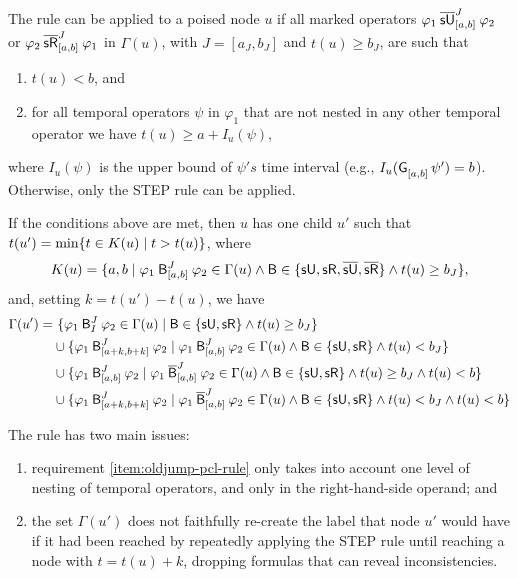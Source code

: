 \documentclass{easychair}
\begin{document}
The \oldjump{} rule can be applied to a poised node $u$ if 
all marked operators
$\msuntil[J]{[a,b]}{\varphi_1}{\varphi_2}$ or $\msrelease[J]{[a,b]}{\varphi_2}{\varphi_1}$ in $\Gamma(u)$,
with $J = [a_J, b_J]$ and $t(u) \geq b_J$, are such that
\begin{enumerate}[label=\roman*.]
\item $t(u) < b$, and
\item \label{item:oldjump-pcl-rule}
    for all temporal operators $\psi$ in $\varphi_1$ that are not nested in any other temporal operator we have $t(u) \geq a + I_u(\psi)$,
\end{enumerate}
where $I_u(\psi)$ is the upper bound of $\psi's$ time interval
(e.g., $I_u(\glob{[a,b]}\psi') = b$).
Otherwise, only the \textsf{STEP} rule can be applied.

If the conditions above are met, then $u$ has one child $u'$ such that $t(u') = \min \set{t \in K(u) \mid t > t(u)}$,
where
\[
K(u) = \set{a, b \mid \anybinop[J]{[a,b]}{\varphi_1}{\varphi_2} \in \Gamma(u) \land \mathsf{B} \in \set{\suntilop, \sreleaseop, \marked{\suntilop}, \marked{\sreleaseop}} \land t(u) \geq b_J},
\]
and, setting $k = t(u') - t(u)$, we have
\begin{align*}
\Gamma(u') =
&\ \set{\anybinop[J]{I}{\varphi_1}{\varphi_2} \in \Gamma(u) \mid \mathsf{B} \in \set{\suntilop, \sreleaseop} \land t(u) \geq b_J} \\ %
&\cup
\set{\anybinop[J]{[a+k, b+k]}{\varphi_1}{\varphi_2} \mid \anybinop[J]{[a,b]}{\varphi_1}{\varphi_2} \in \Gamma(u) \land \mathsf{B} \in \set{\suntilop, \sreleaseop} \land t(u) < b_J} \\ %
&\cup
\set{\anybinop[J]{[a,b]}{\varphi_1}{\varphi_2} \mid \stlbinop[J]{\marked{\mathsf{B}}}{[a,b]}{\varphi_1}{\varphi_2} \in \Gamma(u) \land \mathsf{B} \in \set{\suntilop, \sreleaseop} \land t(u) \geq b_J \land t(u) < b} \\ %
&\cup
\set{\anybinop[J]{[a+k,b+k]}{\varphi_1}{\varphi_2} \mid \stlbinop[J]{\marked{\mathsf{B}}}{[a,b]}{\varphi_1}{\varphi_2} \in \Gamma(u) \land \mathsf{B} \in \set{\suntilop, \sreleaseop} \land t(u) < b_J \land t(u) < b} %
\end{align*}

The \oldjump{} rule has two main issues:
\begin{enumerate}
\item requirement \ref{item:oldjump-pcl-rule} only takes into account one level of nesting of temporal operators, and only in the right-hand-side operand; and
\item the set $\Gamma(u')$ does not faithfully re-create the label that node $u'$ would have if it had been reached by repeatedly applying the \textsf{STEP} rule until reaching a node with $t = t(u) + k$, dropping formulas that can reveal inconsistencies.
\end{enumerate}
\end{document}
